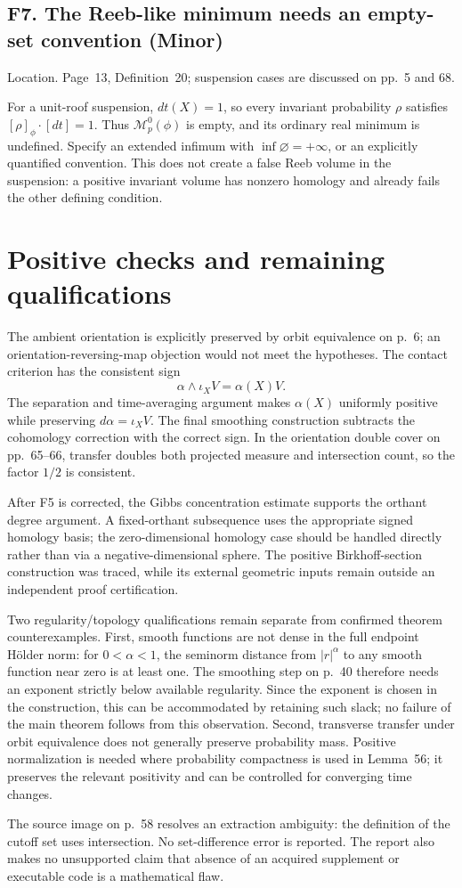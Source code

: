 \documentclass[10pt]{article}
\begin{document}
\subsection*{F7. The Reeb-like minimum needs an empty-set convention (Minor)}
Location. Page 13, Definition 20; suspension cases are discussed on pp. 5 and 68.\par
For a unit-roof suspension, \(dt(X)=1\), so every invariant probability \(\rho\) satisfies \([\rho]_\phi\cdot[dt]=1\). Thus \(\mathcal M_p^0(\phi)\) is empty, and its ordinary real minimum is undefined. Specify an extended infimum with \(\inf\varnothing=+\infty\), or an explicitly quantified convention. This does not create a false Reeb volume in the suspension: a positive invariant volume has nonzero homology and already fails the other defining condition.\par
\section*{Positive checks and remaining qualifications}
The ambient orientation is explicitly preserved by orbit equivalence on p. 6; an orientation-reversing-map objection would not meet the hypotheses. The contact criterion has the consistent sign \[\alpha\wedge\iota_XV=\alpha(X)V.\] The separation and time-averaging argument makes \(\alpha(X)\) uniformly positive while preserving \(d\alpha=\iota_XV\). The final smoothing construction subtracts the cohomology correction with the correct sign. In the orientation double cover on pp. 65–66, transfer doubles both projected measure and intersection count, so the factor \(1/2\) is consistent.\par
After F5 is corrected, the Gibbs concentration estimate supports the orthant degree argument. A fixed-orthant subsequence uses the appropriate signed homology basis; the zero-dimensional homology case should be handled directly rather than via a negative-dimensional sphere. The positive Birkhoff-section construction was traced, while its external geometric inputs remain outside an independent proof certification.\par
Two regularity/topology qualifications remain separate from confirmed theorem counterexamples. First, smooth functions are not dense in the full endpoint Hölder norm: for \(0<\alpha<1\), the seminorm distance from \(|r|^\alpha\) to any smooth function near zero is at least one. The smoothing step on p. 40 therefore needs an exponent strictly below available regularity. Since the exponent is chosen in the construction, this can be accommodated by retaining such slack; no failure of the main theorem follows from this observation. Second, transverse transfer under orbit equivalence does not generally preserve probability mass. Positive normalization is needed where probability compactness is used in Lemma 56; it preserves the relevant positivity and can be controlled for converging time changes.\par
The source image on p. 58 resolves an extraction ambiguity: the definition of the cutoff set uses intersection. No set-difference error is reported. The report also makes no unsupported claim that absence of an acquired supplement or executable code is a mathematical flaw.\par
\end{document}

